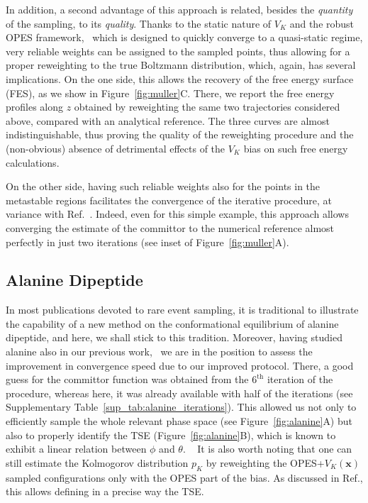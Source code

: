     In addition, a second advantage of this approach is related, besides the \textit{quantity} of the sampling, to its \textit{quality}.
    Thanks to the static nature of $V_K$ and the robust OPES framework,~\cite{invernizzi2022exploration, trizio2024advanced} which is designed to quickly converge to a quasi-static regime, very reliable weights can be assigned to the sampled points, thus allowing for a proper reweighting to the true Boltzmann distribution, which, again, has several implications.
    On the one side, this allows the recovery of the free energy surface (FES), as we show in Figure~\ref{fig:muller}C.
    There, we report the free energy profiles along $z$ obtained by reweighting the same two trajectories considered above, compared with an analytical reference.
    The three curves are almost indistinguishable, thus proving the quality of the reweighting procedure and the (non-obvious) absence of detrimental effects of the $V_K$ bias on such free energy calculations.

    On the other side, having such reliable weights also for the points in the metastable regions facilitates the convergence of the iterative procedure, at variance with Ref.~.
    Indeed, even for this simple example, this approach allows converging the estimate of the committor to the numerical reference almost perfectly in just two iterations (see inset of Figure~\ref{fig:muller}A).
     

    \subsection{Alanine Dipeptide}

    In most publications devoted to rare event sampling, it is traditional to illustrate the capability of a new method on the conformational equilibrium of alanine dipeptide, and here, we shall stick to this tradition.
    Moreover, having studied alanine also in our previous work,~\cite{kang2024computing} we are in the position to assess the improvement in convergence speed due to our improved protocol.
    There, a good guess for the committor function was obtained from the $6^{\text{th}}$ iteration of the procedure, whereas here, it was already available with half of the iterations (see Supplementary Table~\ref{sup_tab:alanine_iterations}).
    This allowed us not only to efficiently sample the whole relevant phase space (see Figure~\ref{fig:alanine}A) but also to properly identify the TSE (Figure~\ref{fig:alanine}B), which is known to exhibit a linear relation between $\phi$ and $\theta$.
    ~\cite{bolhuis2000reaction}   
    It is also worth noting that one can still estimate the Kolmogorov distribution $p_K$ by reweighting the OPES+$ V_K(\textbf{x})$ sampled configurations only with the OPES part of the bias. 
    As discussed in Ref., this allows defining in a precise way the TSE. 

